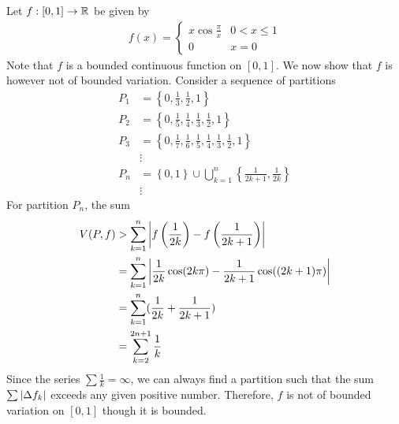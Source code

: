 \documentclass[thmcnt=section, 12pt]{my-elegantbook}
\begin{document}
\begin{example}
    Let $f: [0, 1] \to \mathbb{R}$ be given by
    \begin{align*}
        f(x) = \begin{cases}
                   x\cos \frac{\pi}{x} & 0 < x \leq 1 \\
                   0                   & x = 0
               \end{cases}
    \end{align*}
    Note that $f$ is a bounded continuous function on $[0, 1]$. We now show that $f$ is however not of bounded variation. Consider a sequence of partitions
    \begin{align*}
        P_1 & = \left\{
        0, \frac{1}{3}, \frac{1}{2}, 1
        \right\}        \\
        P_2 & = \left\{
        0,
        \frac{1}{5}, \frac{1}{4},
        \frac{1}{3}, \frac{1}{2},
        1
        \right\}        \\
        P_3 & = \left\{
        0,
        \frac{1}{7}, \frac{1}{6},
        \frac{1}{5}, \frac{1}{4},
        \frac{1}{3}, \frac{1}{2},
        1
        \right\}        \\
            & \vdots    \\
        P_n & = \left\{
        0, 1
        \right\} \cup \bigcup_{k=1}^n \left\{
        \frac{1}{2k+1}, \frac{1}{2k}
        \right\}        \\
            & \vdots
    \end{align*}
    For partition $P_n$, the sum
    \begin{align*}
        V(P, f)
         & > \sum_{k=1}^n \left\lvert 
            f\left( \frac{1}{2k} \right)
            - f\left( \frac{1}{2k+1} \right)
         \right\rvert                                  \\
         & = \sum_{k=1}^n \left\lvert 
            \frac{1}{2k}\cos(2k\pi)
            - \frac{1}{2k+1}\cos((2k+1)\pi)
         \right\rvert                                  \\
         & = \sum_{k=1}^n (
        \frac{1}{2k}
        + \frac{1}{2k+1}
        )                                  \\
         & = \sum_{k=2}^{2n+1} \frac{1}{k}
    \end{align*}
    Since the series $\sum \frac{1}{k} = \infty$, we can always find a partition such that the sum $\sum \left\lvert \Delta f_k \right\rvert$ exceeds any given positive number. Therefore, $f$ is not of bounded variation on $[0, 1]$ though it is bounded.
    \label{eg:6}
\end{example}
\end{document}

